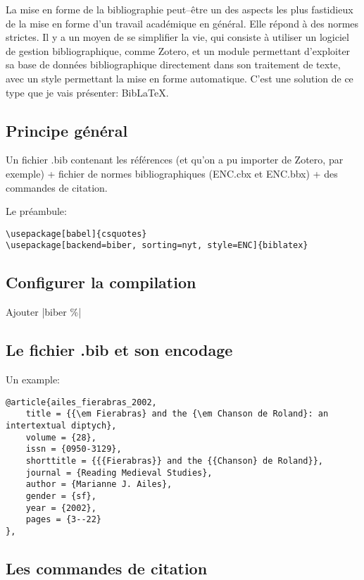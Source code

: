 \documentclass[a4paper,twoside,french,12pt]{book}
\begin{document}
La mise en forme de la bibliographie peut--être un des aspects les plus fastidieux de la mise en forme d'un travail académique en général. Elle répond à des normes strictes. Il y a un moyen de se simplifier la vie, qui consiste à utiliser un logiciel de gestion bibliographique, comme Zotero, et un module permettant d'exploiter sa base de données bibliographique directement dans son traitement de texte, avec un style permettant la mise en forme automatique. C'est une solution de ce type que je vais présenter: BibLaTeX.




\subsection{Principe général}

Un fichier .bib contenant les références (et qu'on a pu importer de Zotero, par exemple) + fichier de normes bibliographiques (ENC.cbx et ENC.bbx) + des commandes de citation.


Le préambule:
\begin{verbatim}
\usepackage[babel]{csquotes}
\usepackage[backend=biber, sorting=nyt, style=ENC]{biblatex}

\end{verbatim}


\subsection{Configurer la compilation}

Ajouter |biber \%|

\subsection{Le fichier .bib et son encodage}

Un example:
\begin{verbatim}
@article{ailes_fierabras_2002,
	title = {{\em Fierabras} and the {\em Chanson de Roland}: an intertextual diptych},
	volume = {28},
	issn = {0950-3129},
	shorttitle = {{{Fierabras}} and the {{Chanson} de Roland}},
	journal = {Reading Medieval Studies},
	author = {Marianne J. Ailes},
	gender = {sf},
	year = {2002},
	pages = {3--22}
},
\end{verbatim}



\subsection{Les commandes de citation}
\end{document}
